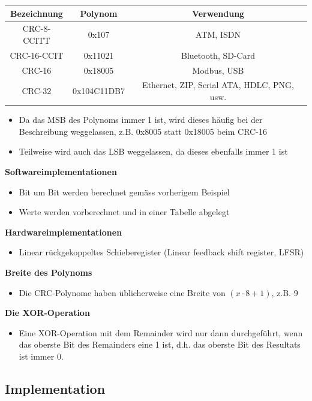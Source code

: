 \begin{tabular}{|c|c|c|}
\hline \textbf{Bezeichnung} & \textbf{Polynom} & \textbf{Verwendung} \\ 
\hline CRC-8-CCITT & 0x107 &  ATM, ISDN\\ 
\hline CRC-16-CCIT & 0x11021 & Bluetooth, SD-Card \\ 
\hline  CRC-16 & 0x18005  &  Modbus, USB\\
\hline  CRC-32 & 0x104C11DB7 & Ethernet, ZIP, Serial ATA, HDLC, PNG, usw. \\
\hline 
\end{tabular} 

\begin{itemize}
	\item Da das MSB des Polynoms immer 1 ist, wird dieses häufig bei der Beschreibung weggelassen, z.B. 0x8005 statt 0x18005 beim CRC-16
	\item Teilweise wird auch das LSB weggelassen, da dieses ebenfalls immer 1 ist	
\end{itemize}

\textbf{Softwareimplementationen}
\begin{itemize}
	\item Bit um Bit werden berechnet gemäss vorherigem Beispiel
	\item Werte werden vorberechnet und in einer Tabelle abgelegt	
\end{itemize}

\textbf{Hardwareimplementationen}
\begin{itemize}
	\item Linear rückgekoppeltes Schieberegister (Linear feedback shift register, LFSR)	
\end{itemize}

\textbf{Breite des Polynoms}
\begin{itemize}
	\item Die CRC-Polynome haben üblicherweise eine Breite von $(x \cdot 8 + 1)$, z.B. 9		
\end{itemize}

\textbf{Die XOR-Operation}
\begin{itemize}
	\item Eine XOR-Operation mit dem Remainder wird nur dann durchgeführt, wenn
	das oberste Bit des Remainders eine 1 ist, d.h. das oberste Bit des Resultats ist
	immer 0.
\end{itemize}

\subsection{Implementation}
